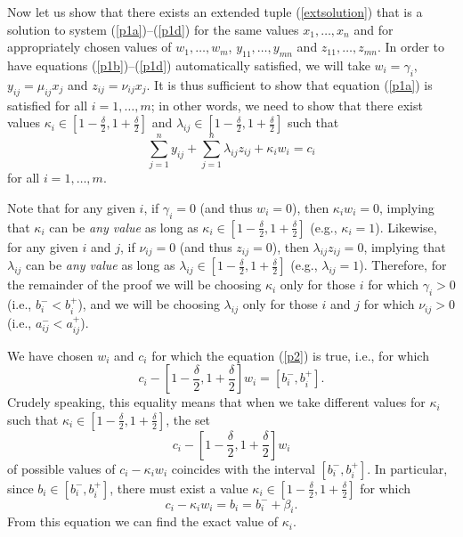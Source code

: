Now let us show that there exists an extended tuple (\ref{extsolution}) that is
a solution to system (\ref{p1a})--(\ref{p1d}) for the same values
$x_1,\ldots,x_n$ and for appropriately chosen values of $w_1,\ldots,w_m$,
$y_{11},\ldots,y_{mn}$ and $z_{11},\ldots,z_{mn}$.  In order to have equations
(\ref{p1b})--(\ref{p1d}) automatically satisfied, we will take $w_i=\gamma_i$,
$y_{ij}=\mu_{ij}x_j$ and $z_{ij}=\nu_{ij}x_j$.  It is thus sufficient to show
that equation (\ref{p1a}) is satisfied for all $i=1,\ldots,m$; in other words,
we need to show that there exist values
${\displaystyle\kappa_i\in[1-\frac{\delta}{2},1+\frac{\delta}{2}]}$ and
${\displaystyle\lambda_{ij}\in[1-\frac{\delta}{2},1+\frac{\delta}{2}]}$ such
that
\begin{equation}
  \sum_{j=1}^n y_{ij}+\sum_{j=1}^n\lambda_{ij}z_{ij}+\kappa_i w_i=c_i
   \label{s1a}
\end{equation}
for all $i=1,\ldots,m$.

Note that for any given $i$, if $\gamma_i=0$ (and thus $w_i=0$), then
$\kappa_i w_i=0$, implying that $\kappa_i$ can be {\em any value\/} as long as
${\displaystyle\kappa_i\in[1-\frac{\delta}{2},1+\frac{\delta}{2}]}$ (e.g., 
$\kappa_i=1$).  Likewise, for any given $i$ and $j$, if $\nu_{ij}=0$ (and thus 
$z_{ij}=0$), then  $\lambda_{ij}z_{ij}=0$, implying that $\lambda_{ij}$ can be 
{\em any value\/} as long as ${\displaystyle\lambda_{ij}\in[1-\frac{\delta}{2},
1+\frac{\delta}{2}]}$ (e.g., $\lambda_{ij}=1$).  Therefore, for the remainder
of the proof we will be choosing $\kappa_i$ only for those $i$ for which
$\gamma_i>0$ (i.e., $b_i^-<b_i^+$), and we will be choosing $\lambda_{ij}$ 
only for those $i$ and $j$ for which $\nu_{ij}>0$ (i.e., $a_{ij}^-<a_{ij}^+$).

We have chosen $w_i$ and $c_i$ for which the equation (\ref{p2}) is true,
i.e., for which
$$
  c_i - [1 - \frac{\delta}{2}, 1 + \frac{\delta}{2}] w_i = [b_i^-, b_i^+].
$$
Crudely speaking, this equality means that when we take different values for
$\kappa_i$ such that
$\kappa_i\in[1-{\displaystyle\frac{\delta}{2}},1+{\displaystyle\frac{\delta}
{2}}]$, the set
$$
  c_i - [1 - \frac{\delta}{2}, 1 + \frac{\delta}{2}] w_i
$$
of possible values of $c_i-\kappa_i w_i$ coincides with the interval
$[b_i^-, b_i^+]$.  In particular, since $b_i\in[b_i^-,b_i^+]$, there must
exist a value $\kappa_i\in[1-{\displaystyle\frac{\delta}{2}},1+{\displaystyle
\frac{\delta}{2}}]$ for which
$$
  c_i-\kappa_i w_i = b_i = b_i^- + \beta_i.
$$
From this equation we can find the exact value of $\kappa_i$.

